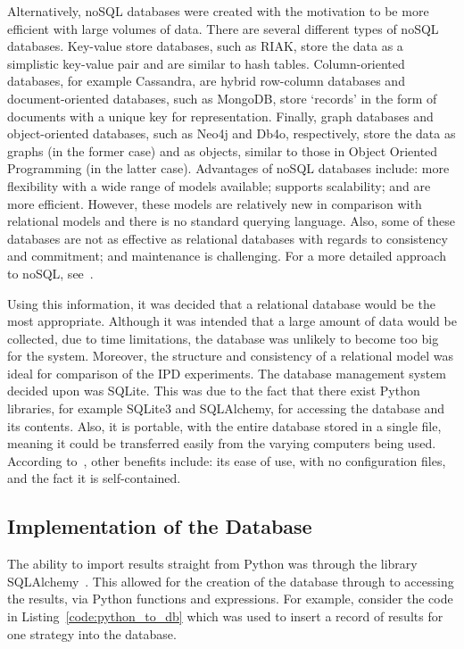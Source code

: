 Alternatively, noSQL databases were created with the motivation to be more
efficient with large volumes of data. There are several different types of noSQL
databases. Key-value store databases, such as RIAK, store the data as a
simplistic key-value pair and are similar to hash tables. Column-oriented
databases, for example Cassandra, are hybrid row-column databases and
document-oriented databases, such as MongoDB, store `records' in the form of
documents with a unique key for representation. Finally, graph databases and
object-oriented databases, such as Neo4j and Db4o, respectively, store the data
as graphs (in the former case) and as objects, similar to those in Object
Oriented Programming (in the latter case). Advantages of noSQL databases
include: more flexibility with a wide range of models available; supports
scalability; and are more efficient. However, these models are relatively new in
comparison with relational models and there is no standard querying language.
Also, some of these databases are not as effective as relational databases
with regards to consistency and commitment; and maintenance is challenging. For a more
detailed approach to noSQL, see~\cite{Nayak2013}.    

Using this information, it was decided that a relational database would be the
most appropriate. Although it was intended that a large amount of data would be
collected, due to time limitations, the database was unlikely
to become too big for the system. Moreover, the structure and consistency of a
relational model was ideal for comparison of the IPD experiments. The database
management system decided upon was SQLite. This was due to the fact that there
exist Python libraries, for example SQLite3 and SQLAlchemy, for accessing the
database and its contents. Also, it is portable, with the entire database stored
in a single file, meaning it could be transferred easily from the varying
computers being used. According to~\cite{ostezer2019}, other benefits include:
its ease of use, with no configuration files, and the fact it is self-contained.

\newpage
\subsection{Implementation of the Database}
The ability to import results straight from Python was through the library
SQLAlchemy~\cite{sqlalchemy}. This allowed for the creation of the database
through to accessing the results, via Python functions and expressions.  
For example, consider the code in Listing~\ref{code:python_to_db} which was used to insert a record of
results for one strategy into the database.

